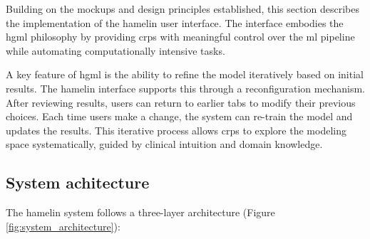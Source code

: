 \documentclass[twoside,final]{Contexto}
\begin{document}
Building on the mockups and design principles established, this section describes the implementation of the \gls{hamelin} user interface. The interface embodies the \gls{hgml} philosophy by providing \glspl{crp} with meaningful control over the \gls{ml} pipeline while automating computationally intensive tasks.

A key feature of \gls{hgml} is the ability to refine the model iteratively based on initial results. The \gls{hamelin} interface supports this through a reconfiguration mechanism. After reviewing results, users can return to earlier tabs to modify their previous choices. Each time users make a change, the system can re-train the model and updates the results. This iterative process allows \glspl{crp} to explore the modeling space systematically, guided by clinical intuition and domain knowledge.

\subsection{System achitecture}

The \gls{hamelin} system follows a three-layer architecture (Figure \ref{fig:system_architecture}):
\end{document}

